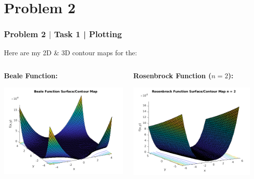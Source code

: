 \documentclass[aspectratio=1610]{beamer}
\begin{document}
\section{Problem 2}

\begin{frame}
\frametitle{Problem 2 $|$ Task 1 | Plotting }

Here are my 2D \& 3D contour maps for the:

\begin{columns}
\begin{column}{.5\textwidth}

\vspace{1em}
\centering
\textbf{Beale Function:}

\vspace{.5em}
\includegraphics[width = .95\textwidth]{2_beals}
\end{column}
\begin{column}{.5\textwidth}

\vspace{1.5em}
\centering
\textbf{Rosenbrock Function ($n = 2$):}

\vspace{.5em}
\includegraphics[width = .95\textwidth]{2_rbrocks}
\end{column}
\end{columns}
\end{frame}
\end{document}
